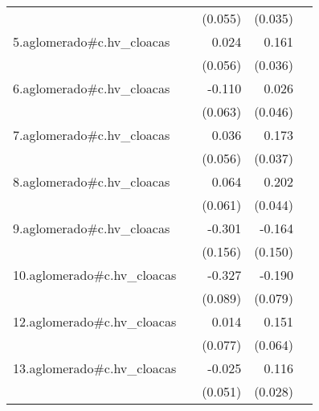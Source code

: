 {\begin{longtable}{l*{4}{D{.}{.}{-1}}}
            &                     &     (0.055)         &     (0.035)         &                     \\
\addlinespace
5.aglomerado#c.hv\_cloacas&                     &       0.024         &       0.161\sym{***}&                     \\
            &                     &     (0.056)         &     (0.036)         &                     \\
\addlinespace
6.aglomerado#c.hv\_cloacas&                     &      -0.110         &       0.026         &                     \\
            &                     &     (0.063)         &     (0.046)         &                     \\
\addlinespace
7.aglomerado#c.hv\_cloacas&                     &       0.036         &       0.173\sym{***}&                     \\
            &                     &     (0.056)         &     (0.037)         &                     \\
\addlinespace
8.aglomerado#c.hv\_cloacas&                     &       0.064         &       0.202\sym{***}&                     \\
            &                     &     (0.061)         &     (0.044)         &                     \\
\addlinespace
9.aglomerado#c.hv\_cloacas&                     &      -0.301         &      -0.164         &                     \\
            &                     &     (0.156)         &     (0.150)         &                     \\
\addlinespace
10.aglomerado#c.hv\_cloacas&                     &      -0.327\sym{***}&      -0.190\sym{*}  &                     \\
            &                     &     (0.089)         &     (0.079)         &                     \\
\addlinespace
12.aglomerado#c.hv\_cloacas&                     &       0.014         &       0.151\sym{*}  &                     \\
            &                     &     (0.077)         &     (0.064)         &                     \\
\addlinespace
13.aglomerado#c.hv\_cloacas&                     &      -0.025         &       0.116\sym{***}&                     \\
            &                     &     (0.051)         &     (0.028)         &                     \\

\end{longtable}}
